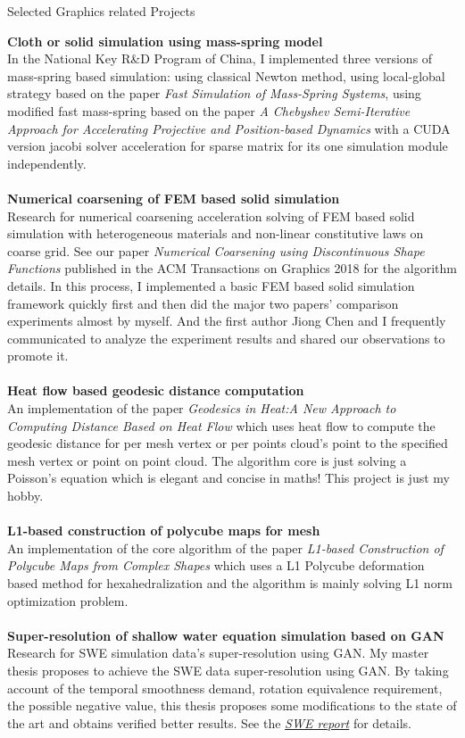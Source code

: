 \documentclass{resume} %
\begin{document}
\begin{rSection}{Selected Graphics related Projects}

  {\bf Cloth or solid simulation using mass-spring model}\\In the National Key R\&D Program of China, I implemented three versions of mass-spring based simulation: using classical Newton method, using local-global strategy based on the paper \textit{Fast Simulation of Mass-Spring Systems}, using modified fast mass-spring based on the paper \textit{A Chebyshev Semi-Iterative Approach for Accelerating Projective and Position-based Dynamics} with a CUDA version jacobi solver acceleration for sparse matrix for its one simulation module independently.\\
  \\{\bf Numerical coarsening of FEM based solid simulation}\\ Research for numerical coarsening acceleration solving of FEM based solid simulation with heterogeneous materials and non-linear constitutive laws on coarse grid. See our paper \emph{Numerical Coarsening using Discontinuous Shape Functions} published in the ACM Transactions on Graphics 2018 for the algorithm details. In this process, I implemented a basic FEM based solid simulation framework quickly first and then did the major two papers' comparison experiments almost by myself. And the first author Jiong Chen and I frequently communicated to analyze the experiment results and shared our observations to promote it. \\
  \\{\bf Heat flow based geodesic distance computation}\\An implementation of the paper \emph{Geodesics in Heat:A New Approach to Computing Distance Based on Heat Flow} which uses heat flow to compute the geodesic distance for per mesh vertex or per points cloud's point to the specified mesh vertex or point on point cloud. The algorithm core is just solving a Poisson's equation which is elegant and concise in maths! This project is just my hobby.\\
  \\{\bf L1-based construction of polycube maps for mesh}\\ An implementation of the core algorithm of the paper \emph{L1-based Construction of Polycube Maps from Complex Shapes} which uses a L1 Polycube deformation based method for hexahedralization and the algorithm is mainly solving L1 norm optimization problem.\\
  \\{\bf Super-resolution of shallow water equation simulation based on GAN}\\ Research for SWE simulation data's super-resolution using GAN. My master thesis proposes to achieve the SWE data super-resolution using GAN. By taking account of the temporal smoothness demand, rotation equivalence requirement, the possible negative value, this thesis proposes some modifications to the state of the art and obtains verified better results. See the \emph{\href{https://wtyatzoo.github.io/reports/SWE.pdf}{SWE report}} for details. \\

\end{rSection}
\end{document}
